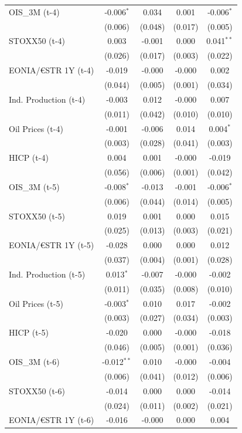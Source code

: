 \begin{longtable}[t]{lcccc}
OIS\_3M (t-4) & -0.006$^{*}$ & 0.034 & 0.001 & -0.006$^{*}$\\
 & (0.006) & (0.048) & (0.017) & (0.005)\\
STOXX50 (t-4) & 0.003 & -0.001 & 0.000 & 0.041$^{**}$\\
 & (0.026) & (0.017) & (0.003) & (0.022)\\
EONIA/€STR 1Y (t-4) & -0.019 & -0.000 & -0.000 & 0.002\\
 & (0.044) & (0.005) & (0.001) & (0.034)\\
Ind. Production (t-4) & -0.003 & 0.012 & -0.000 & 0.007\\
 & (0.011) & (0.042) & (0.010) & (0.010)\\
Oil Prices (t-4) & -0.001 & -0.006 & 0.014 & 0.004$^{*}$\\
 & (0.003) & (0.028) & (0.041) & (0.003)\\
HICP (t-4) & 0.004 & 0.001 & -0.000 & -0.019\\
 & (0.056) & (0.006) & (0.001) & (0.042)\\
OIS\_3M (t-5) & -0.008$^{*}$ & -0.013 & -0.001 & -0.006$^{*}$\\
 & (0.006) & (0.044) & (0.014) & (0.005)\\
STOXX50 (t-5) & 0.019 & 0.001 & 0.000 & 0.015\\
 & (0.025) & (0.013) & (0.003) & (0.021)\\
EONIA/€STR 1Y (t-5) & -0.028 & 0.000 & 0.000 & 0.012\\
 & (0.037) & (0.004) & (0.001) & (0.028)\\
Ind. Production (t-5) & 0.013$^{*}$ & -0.007 & -0.000 & -0.002\\
 & (0.011) & (0.035) & (0.008) & (0.010)\\
Oil Prices (t-5) & -0.003$^{*}$ & 0.010 & 0.017 & -0.002\\
 & (0.003) & (0.027) & (0.034) & (0.003)\\
HICP (t-5) & -0.020 & 0.000 & -0.000 & -0.018\\
 & (0.046) & (0.005) & (0.001) & (0.036)\\
OIS\_3M (t-6) & -0.012$^{**}$ & 0.010 & -0.000 & -0.004\\
 & (0.006) & (0.041) & (0.012) & (0.006)\\
STOXX50 (t-6) & -0.014 & 0.000 & 0.000 & -0.014\\
 & (0.024) & (0.011) & (0.002) & (0.021)\\
EONIA/€STR 1Y (t-6) & -0.016 & -0.000 & 0.000 & 0.004\\

\end{longtable}
